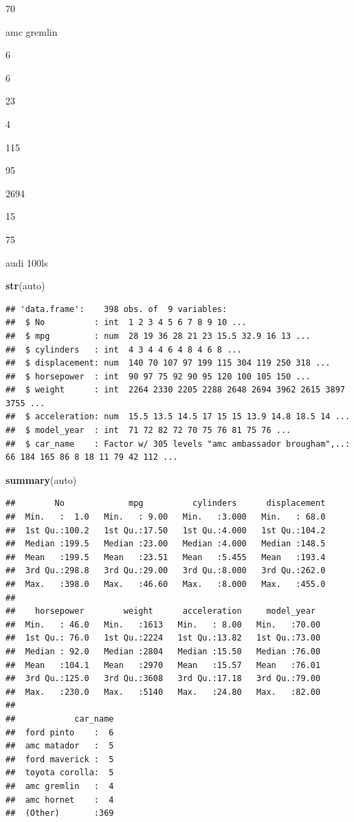 \documentclass[]{article}
\newenvironment{Shaded}{\begin{snugshade}}{\end{snugshade}}
\newcommand{\KeywordTok}[1]{\textcolor[rgb]{0.13,0.29,0.53}{\textbf{#1}}}
\newcommand{\NormalTok}[1]{#1}
\begin{document}
70

amc gremlin

6

6

23

4

115

95

2694

15

75

audi 100ls

\begin{Shaded}
\begin{Highlighting}[]
\KeywordTok{str}\NormalTok{(auto)}
\end{Highlighting}
\end{Shaded}

\begin{verbatim}
## 'data.frame':    398 obs. of  9 variables:
##  $ No          : int  1 2 3 4 5 6 7 8 9 10 ...
##  $ mpg         : num  28 19 36 28 21 23 15.5 32.9 16 13 ...
##  $ cylinders   : int  4 3 4 4 6 4 8 4 6 8 ...
##  $ displacement: num  140 70 107 97 199 115 304 119 250 318 ...
##  $ horsepower  : int  90 97 75 92 90 95 120 100 105 150 ...
##  $ weight      : int  2264 2330 2205 2288 2648 2694 3962 2615 3897 3755 ...
##  $ acceleration: num  15.5 13.5 14.5 17 15 15 13.9 14.8 18.5 14 ...
##  $ model_year  : int  71 72 82 72 70 75 76 81 75 76 ...
##  $ car_name    : Factor w/ 305 levels "amc ambassador brougham",..: 66 184 165 86 8 18 11 79 42 112 ...
\end{verbatim}

\begin{Shaded}
\begin{Highlighting}[]
\KeywordTok{summary}\NormalTok{(auto)}
\end{Highlighting}
\end{Shaded}

\begin{verbatim}
##        No             mpg          cylinders      displacement  
##  Min.   :  1.0   Min.   : 9.00   Min.   :3.000   Min.   : 68.0  
##  1st Qu.:100.2   1st Qu.:17.50   1st Qu.:4.000   1st Qu.:104.2  
##  Median :199.5   Median :23.00   Median :4.000   Median :148.5  
##  Mean   :199.5   Mean   :23.51   Mean   :5.455   Mean   :193.4  
##  3rd Qu.:298.8   3rd Qu.:29.00   3rd Qu.:8.000   3rd Qu.:262.0  
##  Max.   :398.0   Max.   :46.60   Max.   :8.000   Max.   :455.0  
##                                                                 
##    horsepower        weight      acceleration     model_year   
##  Min.   : 46.0   Min.   :1613   Min.   : 8.00   Min.   :70.00  
##  1st Qu.: 76.0   1st Qu.:2224   1st Qu.:13.82   1st Qu.:73.00  
##  Median : 92.0   Median :2804   Median :15.50   Median :76.00  
##  Mean   :104.1   Mean   :2970   Mean   :15.57   Mean   :76.01  
##  3rd Qu.:125.0   3rd Qu.:3608   3rd Qu.:17.18   3rd Qu.:79.00  
##  Max.   :230.0   Max.   :5140   Max.   :24.80   Max.   :82.00  
##                                                                
##            car_name  
##  ford pinto    :  6  
##  amc matador   :  5  
##  ford maverick :  5  
##  toyota corolla:  5  
##  amc gremlin   :  4  
##  amc hornet    :  4  
##  (Other)       :369
\end{verbatim}
\end{document}
